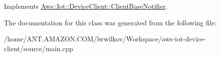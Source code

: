 Implements \hyperlink{class_aws_1_1_iot_1_1_device_client_1_1_client_base_notifier_ae892fac9b0a778d8882bf56cb88ec26d}{Aws\+::\+Iot\+::\+Device\+Client\+::\+Client\+Base\+Notifier}.



The documentation for this class was generated from the following file\+:\begin{DoxyCompactItemize}
\item 
/home/\+A\+N\+T.\+A\+M\+A\+Z\+O\+N.\+C\+O\+M/lwwilkov/\+Workspace/aws-\/iot-\/device-\/client/source/main.\+cpp\end{DoxyCompactItemize}
